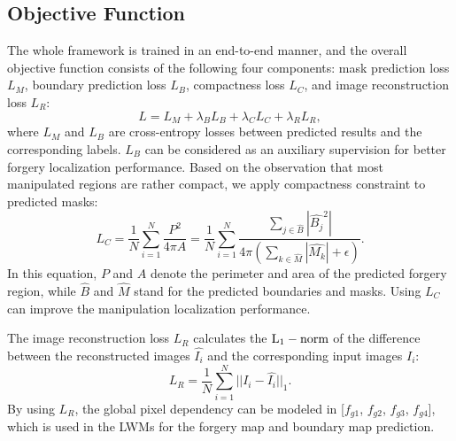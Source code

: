 \documentclass[10pt,journal,compsoc]{IEEEtran}
\begin{document}


\subsection{Objective Function}
The whole framework is trained in an end-to-end manner, and the overall objective function consists of the following four components: mask prediction loss $L_{M}$, boundary prediction loss $L_{B}$, compactness loss $L_{C}$, and image reconstruction loss $L_{R}$:
\begin{equation}
     L = L_{M} + {\lambda_{B}} L_{B} + {\lambda_{C}} L_{C} + {\lambda_{R}} L_{R},
\end{equation}
where $L_{M}$ and $L_{B}$ are cross-entropy losses between predicted results and the corresponding labels. $L_{B}$ can be considered as an auxiliary supervision for better forgery localization performance. Based on the observation that most manipulated regions are rather compact, we apply compactness constraint to predicted masks:
\begin{equation}
     L_{C} = \frac{1}{N}\sum_{{i=1}}^{N}\frac{P^{2}}{4\pi A} = \frac{1}{N}\sum_{{i=1}}^{N}\frac{\sum_{{j\in \hat{B}}}|\hat{B_{j}}^2|}{4\pi (\sum_{{k\in \hat{M}}}|\hat{M_{k}}|+\epsilon)}.
\end{equation}
In this equation, $P$ and $A$ denote the perimeter and area of the predicted forgery region, while $\hat{B}$ and $\hat{M}$ stand for the predicted boundaries and masks. Using $L_{C}$ can improve the manipulation localization performance.

The image reconstruction loss $L_{R}$ calculates the $\rm L_{1}-norm$ of the difference between the reconstructed images $\hat{I_{i}}$ and the corresponding input images $I_{i}$:
\begin{equation}
     L_{R}= \frac{1}{N}\sum_{{i=1}}^{N}
     ||I_{i}-\hat{I_{i}}||_{1}.
\end{equation}
By using $L_{R}$, the global pixel dependency can be modeled in [$f_{g1}$, $f_{g2}$, $f_{g3}$, $f_{g4}$], which is used in the LWMs for the forgery map and boundary map prediction. 
\end{document}
